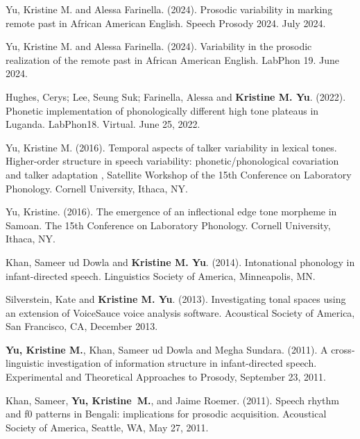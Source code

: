 \documentclass[10pt]{article}
\begin{document}
\begin{bibenum}

\item Yu, Kristine M. and Alessa Farinella. (2024). Prosodic variability in marking remote past in African American English. Speech Prosody 2024. July 2024.

\item Yu, Kristine M. and Alessa Farinella. (2024). Variability in the prosodic realization of the remote past in African American English. LabPhon 19. June 2024.

\item Hughes, Cerys; Lee, Seung Suk; Farinella, Alessa and \textbf{Kristine M. Yu}. (2022). Phonetic implementation of phonologically different high tone plateaus in Luganda. LabPhon18. Virtual. June 25, 2022.

\item Yu, Kristine M. (2016). Temporal aspects of talker variability in lexical tones. Higher-order structure in speech variability: phonetic/phonological covariation and talker adaptation
, Satellite Workshop of the 15th Conference on Laboratory
  Phonology. Cornell University, Ithaca, NY.

\item Yu, Kristine. (2016). The emergence of an inflectional edge tone
  morpheme in Samoan. The 15th Conference on Laboratory
  Phonology. Cornell University, Ithaca, NY.

\item Khan, Sameer ud Dowla and \textbf{Kristine M. Yu}. (2014). Intonational phonology
  in infant-directed speech. Linguistics Society of America, Minneapolis, MN.

\item Silverstein, Kate and \textbf{Kristine M. Yu}. (2013). Investigating
  tonal spaces using an extension of VoiceSauce voice analysis
  software. Acoustical Society of America, San Francisco, CA, December 2013.

\item \textbf{Yu, Kristine M.}, Khan, Sameer ud Dowla and Megha Sundara. (2011). A cross-linguistic
investigation of information structure in infant-directed
speech. Experimental and Theoretical Approaches to Prosody, September 23, 2011.

\item Khan, Sameer, \textbf{Yu, Kristine~M.}, and Jaime Roemer. (2011). Speech rhythm and f0 patterns
in Bengali: implications for prosodic acquisition. Acoustical
Society of America, Seattle, WA, May 27, 2011.


\end{bibenum}
\end{document}
